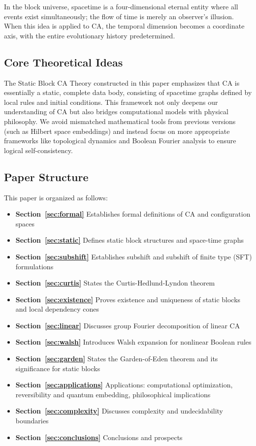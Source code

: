 \documentclass[11pt]{article}
\theoremstyle{definition}
\theoremstyle{remark}
\begin{document}
In the block universe, spacetime is a four-dimensional eternal entity where all events exist simultaneously; the flow of time is merely an observer's illusion. When this idea is applied to CA, the temporal dimension becomes a coordinate axis, with the entire evolutionary history predetermined.

\subsection{Core Theoretical Ideas}

The Static Block CA Theory constructed in this paper emphasizes that CA is essentially a static, complete data body, consisting of spacetime graphs defined by local rules and initial conditions. This framework not only deepens our understanding of CA but also bridges computational models with physical philosophy. We avoid mismatched mathematical tools from previous versions (such as Hilbert space embeddings) and instead focus on more appropriate frameworks like topological dynamics and Boolean Fourier analysis to ensure logical self-consistency.

\subsection{Paper Structure}

This paper is organized as follows:

\begin{itemize}
\item \textbf{Section~\ref{sec:formal}} Establishes formal definitions of CA and configuration spaces
\item \textbf{Section~\ref{sec:static}} Defines static block structures and space-time graphs
\item \textbf{Section~\ref{sec:subshift}} Establishes subshift and subshift of finite type (SFT) formulations
\item \textbf{Section~\ref{sec:curtis}} States the Curtis-Hedlund-Lyndon theorem
\item \textbf{Section~\ref{sec:existence}} Proves existence and uniqueness of static blocks and local dependency cones
\item \textbf{Section~\ref{sec:linear}} Discusses group Fourier decomposition of linear CA
\item \textbf{Section~\ref{sec:walsh}} Introduces Walsh expansion for nonlinear Boolean rules
\item \textbf{Section~\ref{sec:garden}} States the Garden-of-Eden theorem and its significance for static blocks
\item \textbf{Section~\ref{sec:applications}} Applications: computational optimization, reversibility and quantum embedding, philosophical implications
\item \textbf{Section~\ref{sec:complexity}} Discusses complexity and undecidability boundaries
\item \textbf{Section~\ref{sec:conclusions}} Conclusions and prospects
\end{itemize}
\end{document}
